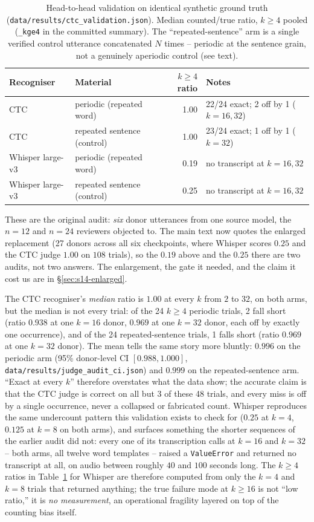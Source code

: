 \documentclass[11pt]{article}
\begin{document}
\begin{table}[h]
\centering
\caption{Head-to-head validation on identical synthetic ground truth
(\texttt{data/results/ctc\_validation.json}). Median counted/true ratio,
$k\ge4$ pooled (\texttt{\_kge4} in the committed summary). The
``repeated-sentence'' arm is a single verified control utterance
concatenated $N$ times -- periodic at the sentence grain, not a genuinely
aperiodic control (see text).}
\label{tab:ctcval}
\small
\begin{tabular}{@{}llrl@{}}
\toprule
Recogniser & Material & $k\ge4$ ratio & Notes \\
\midrule
CTC & periodic (repeated word) & 1.00 & 22/24 exact; 2 off by 1 ($k{=}16,32$) \\
CTC & repeated sentence (control) & 1.00 & 23/24 exact; 1 off by 1 ($k{=}32$) \\
Whisper large-v3 & periodic (repeated word) & 0.19 & no transcript at $k{=}16,32$ \\
Whisper large-v3 & repeated sentence (control) & 0.25 & no transcript at $k{=}16,32$ \\
\bottomrule
\end{tabular}
\end{table}

\noindent These are the original audit: \emph{six} donor utterances from one
source model, the $n{=}12$ and $n{=}24$ reviewers objected to. The main text now
quotes the enlarged replacement (27 donors across all six checkpoints, where
Whisper scores $0.25$ and the CTC judge $1.00$ on $108$ trials), so the
$0.19$ above and the $0.25$ there are two audits, not two answers. The
enlargement, the gate it needed, and the claim it cost us are in
\S\ref{sec:s14-enlarged}.

The CTC recogniser's \emph{median} ratio is $1.00$ at every $k$ from $2$ to
$32$, on both arms, but the median is not every trial: of the 24
$k\ge4$ periodic trials, 2 fall short (ratio $0.938$ at one $k{=}16$ donor,
$0.969$ at one $k{=}32$ donor, each off by exactly one occurrence), and of
the 24 repeated-sentence trials, 1 falls short (ratio $0.969$ at one
$k{=}32$ donor). The mean tells the same story more bluntly: $0.996$ on the
periodic arm (95\% donor-level CI $[0.988, 1.000]$,
\texttt{data/results/judge\_audit\_ci.json}) and $0.999$ on the
repeated-sentence arm. ``Exact at every $k$'' therefore overstates what the
data show; the accurate claim is that the CTC judge is correct on all but 3
of these 48 trials, and every miss is off by a single occurrence, never a
collapsed or fabricated count. Whisper reproduces the same undercount
pattern this validation exists to check for ($0.25$ at $k{=}4$, $0.125$ at
$k{=}8$ on both arms), and surfaces something the shorter sequences of
the earlier audit did not: every one of its transcription calls at $k{=}16$
and $k{=}32$ -- both arms, all twelve word templates -- raised a
\texttt{ValueError} and returned no transcript at all, on audio between
roughly $40$ and $100$ seconds long. The $k\ge4$ ratios in
Table~\ref{tab:ctcval} for Whisper are therefore computed from only the
$k{=}4$ and $k{=}8$ trials that returned anything; the true failure mode at
$k\ge16$ is not ``low ratio,'' it is \emph{no measurement}, an operational
fragility layered on top of the counting bias itself.
\end{document}
